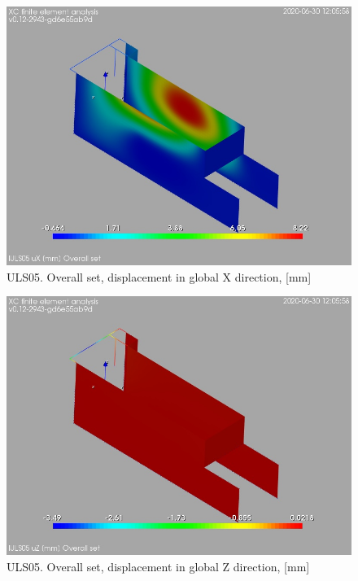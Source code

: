 \clearpage
\begin{figure}
\begin{center}
\includegraphics[width=\linewidth]{ramp_wall/resLC/text/graphics/resSimplLC/lULS05overallSetuX}
\caption{ULS05. Overall set, displacement in global X direction, [mm]}
\end{center}
\end{figure}
\begin{figure}
\begin{center}
\includegraphics[width=\linewidth]{ramp_wall/resLC/text/graphics/resSimplLC/lULS05overallSetuZ}
\caption{ULS05. Overall set, displacement in global Z direction, [mm]}
\end{center}
\end{figure}
